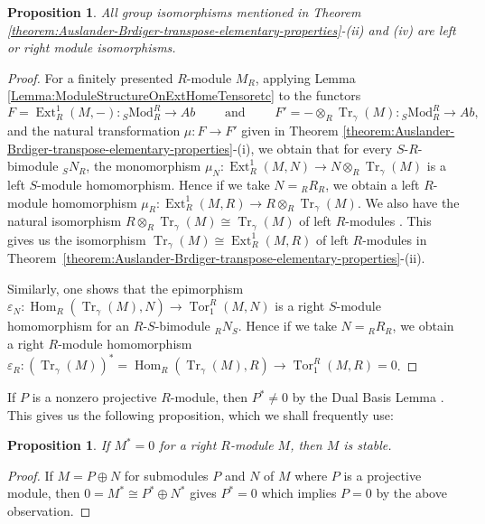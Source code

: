 \documentclass[11pt,a4paper]{amsart}
\theoremstyle{plain}
\newtheorem{proposition}[theorem]{Proposition}
\theoremstyle{definition}
\theoremstyle{remark}
\newcommand{\Ext}{\operatorname{Ext}}
\newcommand{\Tor}{\operatorname{Tor}}
\newcommand{\Hom}{\operatorname{Hom}}
\newcommand{\Tr}{\operatorname{Tr}}
\newcommand{\Transpose}{\operatorname{Tr}}
\begin{document}
\begin{proposition}
All group isomorphisms mentioned in
 Theorem \ref{theorem:Auslander-Brdiger-transpose-elementary-properties}-(ii) and (iv) are left or right module isomorphisms.
\end{proposition}
\begin{proof}
 For a finitely presented  $R$-module $ M_R $, applying Lemma \ref{Lemma:ModuleStructureOnExtHomeTensoretc} to the functors
  \[ F= \Ext^1_R(M,-):{ }_S \mathrm{Mod}_R^R \rightarrow A b
  \qquad \text{ and } \qquad
    F'= -\otimes_R \Tr_\gamma(M):{ }_S \mathrm{Mod}_R^R \rightarrow Ab, \]
and the natural transformation $ \mu:F\to F'$  given in Theorem \ref{theorem:Auslander-Brdiger-transpose-elementary-properties}-(i), we obtain that for every $ S $-$R $-bimodule $ { }_S N_R$, the monomorphism $\mu_N : \Ext^1_R(M,N)\rightarrow N \otimes_R \Transpose_\gamma(M)$ is a left $ S $-module homomorphism. Hence if we take $ N=  { }_R R_R$, we obtain a left $ R $-module homomorphism $\mu_R : \Ext^1_R(M,R)\rightarrow R \otimes_R \Transpose_\gamma(M)$. We also have the natural isomorphism $ R \otimes_R \Transpose_\gamma(M) \cong   \Transpose_\gamma(M) $ of left $ R $-modules \cite[\S V.3, Eqn. (3.9)]{Maclane:Homology}. This gives us the isomorphism $  \Transpose_\gamma(M) \cong  \Ext^1_R(M,R) $ of left $ R $-modules in Theorem~\ref{theorem:Auslander-Brdiger-transpose-elementary-properties}-(ii).

 Similarly, one shows that the epimorphism $\varepsilon_N : \Hom_R(\Transpose_\gamma(M),N) \rightarrow \Tor_1^R(M,N)$ is a right $ S $-module homomorphism for an $ R $-$S $-bimodule $ { }_R N_S$. Hence if we take $ N=  { }_R R_R$, we obtain a right $ R $-module homomorphism $\varepsilon_R : (\Transpose_\gamma(M))^*= \Hom_R(\Transpose_\gamma(M),R) \rightarrow \Tor_1^R(M,R)=0$.
\end{proof}


If $P$ is a nonzero projective $R$-module, then $P^*\neq 0$ {by the Dual Basis Lemma \cite[Theorem 5.4.2]{Kasch:ModulesAndRings}}. This gives us the following proposition, which
we shall frequently use:




\begin{proposition}\label{Proposition:Zero-dual-implies-stable} \cite[Lemma 2.6, (1)$\implies$(3)]{Martsinkovsky:TheStableCategoryOfALeftHereditaryRing}
  If $M^*=0$ for a right $R$-module $M$, then $M$ is stable.
\end{proposition}
\begin{proof}
  If $M=P\oplus N$ for submodules $P$ and $N$ of $M$ where $P$ is a projective module, then $0=M^*\cong P^* \oplus N^*$ gives $P^*=0$ which implies $P=0$ by the above observation.
\end{proof}
\end{document}
